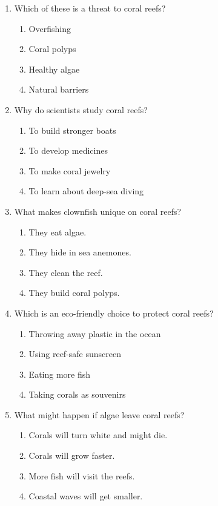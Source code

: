 \documentclass[12pt]{article}
\begin{document}
\begin{enumerate}
\item Which of these is a threat to coral reefs?
\begin{enumerate}[label=\Alph*.]
    \item Overfishing
    \item Coral polyps
    \item Healthy algae
    \item Natural barriers
\end{enumerate}

\item Why do scientists study coral reefs?
\begin{enumerate}[label=\Alph*.]
    \item To build stronger boats
    \item To develop medicines
    \item To make coral jewelry
    \item To learn about deep-sea diving
\end{enumerate}

\item What makes clownfish unique on coral reefs?
\begin{enumerate}[label=\Alph*.]
    \item They eat algae.
    \item They hide in sea anemones.
    \item They clean the reef.
    \item They build coral polyps.
\end{enumerate}

\item Which is an eco-friendly choice to protect coral reefs?
\begin{enumerate}[label=\Alph*.]
    \item Throwing away plastic in the ocean
    \item Using reef-safe sunscreen
    \item Eating more fish
    \item Taking corals as souvenirs
\end{enumerate}

\item What might happen if algae leave coral reefs?
\begin{enumerate}[label=\Alph*.]
    \item Corals will turn white and might die.
    \item Corals will grow faster.
    \item More fish will visit the reefs.
    \item Coastal waves will get smaller.
\end{enumerate}


\end{enumerate}
\end{document}
